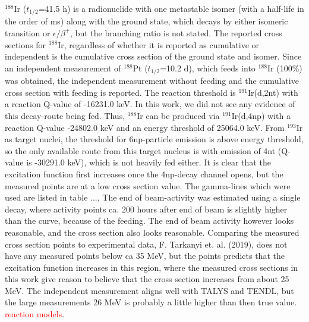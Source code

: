 \documentclass[a4paper,11pt,twoside]{book}
\begin{document}
\subsubsection{}
$^{188}$Ir ($t_{1/2}$=41.5 h) is a radionuclide with one metastable isomer (with a half-life in the order of ms) along with the ground state, which decays by either isomeric transition or $\epsilon/\beta^+$, but the branching ratio is not stated. The reported cross sections for $^{188}$Ir, regardless of whether it is reported as cumulative or independent is the cumulative cross section of the ground state and isomer. Since an independent measurement of $^{188}$Pt ($t_{1/2}$=10.2 d), which feeds into $^{188}$Ir (100\%) was obtained, the independent measurement without feeding and the cumulative cross section with feeding is reported. The reaction threshold is $^{191}$Ir(d,2nt) with a reaction Q-value of -16231.0 keV. In this work, we did not see any evidence of this decay-route being fed. Thus, $^{188}$Ir can be produced via $^{191}$Ir(d,4np) with a reaction Q-value -24802.0 keV and an energy threshold of 25064.0 keV. From $^{193}$Ir as target nuclei, the threshold for 6np-particle emission is above energy threshold, so the only available route from this target nucleus is with emission of 4nt (Q-value is -30291.0 keV), which is not heavily fed either. It is clear that the excitation function first increases once the 4np-decay channel opens, but the measured points are at a low cross section value. The gamma-lines which were used are listed in table ..., The end of beam-activity was estimated using a single decay, where activity points ca. 200 hours after end of beam is slightly higher than the curve, because of the feeding. The end of beam activity however looks reasonable, and the cross section also looks reasonable. Comparing the measured cross section points to experimental data, F. Tarkanyi et. al. (2019), does not have any measured points below ca 35 MeV, but the points predicts that the excitation function increases in this region, where the measured cross sections in this work give reason to believe that the cross section increases from about 25 MeV. The independent measurement aligns well with TALYS and TENDL, but the large measurements 26 MeV is probably a little higher than then true value. \textcolor{red}{reaction models}. 
\end{document}
